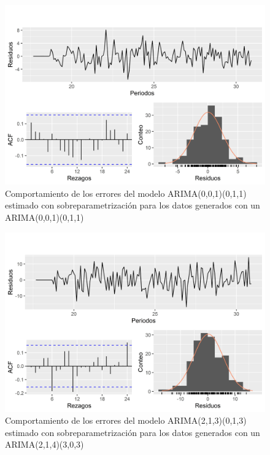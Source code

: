 \documentclass[
]{article}
\begin{document}
\begin{figure}[H]
\includegraphics[width=1\linewidth,height=1\textheight]{Tesis_files/figure-latex/errores_simulados_sobreparametrizacion5-1} \caption{Comportamiento de los errores del modelo ARIMA(0,0,1)(0,1,1) estimado con sobreparametrización para los datos generados con un ARIMA(0,0,1)(0,1,1)}\label{fig:errores_simulados_sobreparametrizacion5}
\end{figure}

\begin{figure}[H]
\includegraphics[width=1\linewidth,height=1\textheight]{Tesis_files/figure-latex/errores_simulados_sobreparametrizacion6-1} \caption{Comportamiento de los errores del modelo ARIMA(2,1,3)(0,1,3) estimado con sobreparametrización para los datos generados con un ARIMA(2,1,4)(3,0,3)}\label{fig:errores_simulados_sobreparametrizacion6}
\end{figure}
\end{document}
